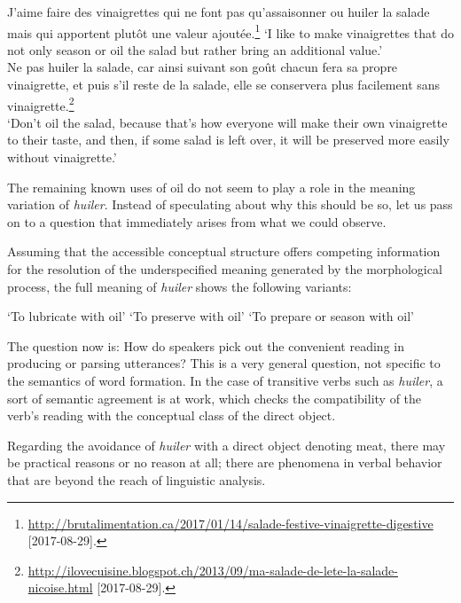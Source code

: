 \documentclass[output=paper]{langsci/langscibook}
\begin{document}
\ea\label{ex:Schwarze:25} J'aime faire des vinaigrettes qui ne font pas qu'assaisonner ou huiler la salade mais qui apportent plutôt une valeur ajoutée.\footnote{\url{http://brutalimentation.ca/2017/01/14/salade-festive-vinaigrette-digestive} [2017-08-29].}
   \glt `I like to make vinaigrettes that do not only season or oil the salad but rather bring an additional value.'\\

\ex\label{ex:Schwarze:26} Ne pas huiler la salade, car ainsi suivant son goût chacun fera sa propre vinaigrette, et puis s'il reste de la salade, elle se conservera plus facilement sans vinaigrette.\footnote{\url{http://ilovecuisine.blogspot.ch/2013/09/ma-salade-de-lete-la-salade-nicoise.html}
[2017-08-29].}\\
   \glt `Don't oil the salad, because that's how everyone will make their own vinaigrette to their taste, and then, if some salad is left over, it will be preserved more easily without vinaigrette.'\\
\z




The remaining known uses of oil do not seem to play a role in the meaning variation of  \emph{huiler}. Instead of speculating about why this should be so, let us pass on to a question that immediately arises from what we could observe.

Assuming that the accessible conceptual structure offers competing information for the resolution of the underspecified meaning generated by the morphological process, the full meaning of \emph{huiler} shows the following variants:

\ea \label{ex:Schwarze:27}
  \ea `To lubricate with oil'
  \ex `To preserve with oil'
  \ex `To prepare or season with oil'
\z\z

The question now is: How do speakers pick out the convenient reading in producing or parsing utterances? This is a very general question, not specific to the semantics of word formation. In the case of transitive verbs such as \emph{huiler}, a sort of semantic agreement is at work,
which checks the compatibility of the verb's reading with the conceptual class of the direct object.

Regarding the avoidance of \emph{huiler} with a direct object denoting meat, there may be practical reasons or no reason at all; there are phenomena in verbal behavior that are beyond the reach of linguistic analysis.
\end{document}
